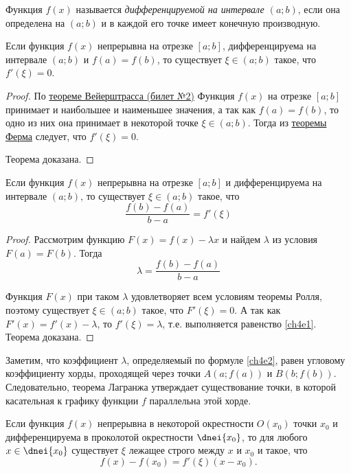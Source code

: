 \begin{defn}
Функция $f(x)$ называется \textit{дифференцируемой на интервале $(a;b)$}, если она определена на $(a;b)$ и в каждой его точке имеет конечную производную.

\end{defn}
\begin{thm} [Ролля] Если функция $f(x)$ непрерывна на отрезке $[a; b]$, дифференцируема на интервале $(a; b)$ и $f(a) = f(b)$, то существует $\xi \in (a; b)$ такое, что $f'(\xi) = 0$.
\end{thm}
\begin{proof}
По \hyperref[ch1n1]{теореме Вейерштрасса (билет №2)} Функция $f(x)$ на отрезке $[a;b]$ принимает и наибольшее и наименьшее значения, а так как $f(a) = f(b)$, то одно из них она принимает в некоторой точке $\xi \in (a; b)$. Тогда из  \hyperref[ch4n1]{теоремы Ферма} следует, что $f'(\xi) = 0$.
 
\noindent Теорема доказана.
\end{proof}

\begin{thm}[Лагранжа]\label{ch4t1} Если функция $f(x)$ непрерывна на отрезке $[a; b]$ и дифференцируема на интервале $(a; b)$, то существует $\xi \in (a; b)$ такое, что
\begin{equation}\label{ch4e1}
\frac{f(b)-f(a)}{b-a}=f'(\xi)
\end{equation}
\end{thm}

\begin{proof} Рассмотрим функцию $F(x) = f(x) - \lambda x$ и найдем $\lambda$ из условия $F(a) = F(b)$. Тогда
\begin{equation}\label{ch4e2}
\lambda=\frac{f(b)-f(a)}{b-a}
\end{equation}

Функция $F(x)$ при таком $\lambda$ удовлетворяет всем условиям теоремы Ролля, поэтому существует $\xi \in (a; b)$ такое, что $F'(\xi) = 0$. А так как $F'(x) = f'(x) - \lambda$, то $f'(\xi) = \lambda$, т.е. выполняется равенство \eqref{ch4e1}. 
\noindent Теорема доказана.
\end{proof}
Заметим, что коэффициент $\lambda$, определяемый по формуле \eqref{ch4e2}, равен угловому коэффициенту хорды, проходящей через точки $A(a;f(a))$ и $B(b;f(b))$. Следовательно, теорема Лагранжа утверждает существование точки, в которой касательная к графику функции $f$ параллельна этой хорде.
\begin{cons} 
Если функция $f(x)$ непрерывна в некоторой окрестности $O(x_0)$ точки $x_0$ и дифференцируема в проколотой
окрестности $\dnei{x_0}$, то для любого $x \in \dnei{x_0}$ существует $\xi$ лежащее строго между $x$ и $x_0$ и такое, что
\begin{equation}\label{ch4e3}
f(x)-f(x_0)=f'(\xi)(x-x_0).
\end{equation}
\end{cons}


